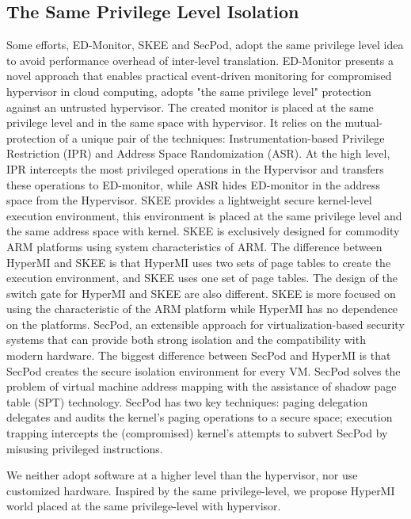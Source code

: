 \documentclass[conference]{IEEEtran}
\begin{document}
\subsection{The Same Privilege Level Isolation}
Some efforts, ED-Monitor\cite{Deng2017Dancing}, SKEE\cite{Azab2016SKEE} and SecPod\cite{Wang2015SecPod}, adopt the same privilege level idea to avoid performance overhead of inter-level translation. ED-Monitor presents a novel approach that enables practical event-driven monitoring for compromised hypervisor in cloud computing, adopts "the same privilege level" protection against an untrusted hypervisor. The created monitor is placed at the same privilege level and in the same space with hypervisor. It relies on the mutual-protection of a
unique pair of the techniques: Instrumentation-based Privilege Restriction (IPR) and Address Space Randomization (ASR). At the high level, IPR intercepts the most privileged operations in the Hypervisor and transfers these operations to ED-monitor, while ASR hides ED-monitor in the address space from the Hypervisor.
 SKEE provides a lightweight secure kernel-level execution environment, this environment is placed at the same privilege level and the same address space with kernel. SKEE is exclusively designed for commodity ARM platforms using system characteristics of ARM. The difference between HyperMI and SKEE is that HyperMI uses two sets of page tables to create the execution environment, and SKEE uses one set of page tables. The design of the switch gate for HyperMI and SKEE are also different. SKEE is more focused on using the characteristic of the ARM platform while HyperMI has no dependence on the platforms.
SecPod, an extensible approach for virtualization-based security systems that can provide both strong isolation and the compatibility with modern hardware. The biggest difference between SecPod and HyperMI is that SecPod creates the secure isolation environment for every VM. SecPod solves the problem of virtual machine address mapping with the assistance of shadow page table (SPT) technology. SecPod has two key techniques: paging delegation delegates and audits the kernel's paging operations to a secure space; execution trapping intercepts the (compromised) kernel's attempts to subvert SecPod by misusing privileged instructions.

We neither adopt software at a higher level than the hypervisor, nor use customized hardware. Inspired by the same privilege-level, we propose HyperMI world placed at the same privilege-level with hypervisor.
\end{document}
